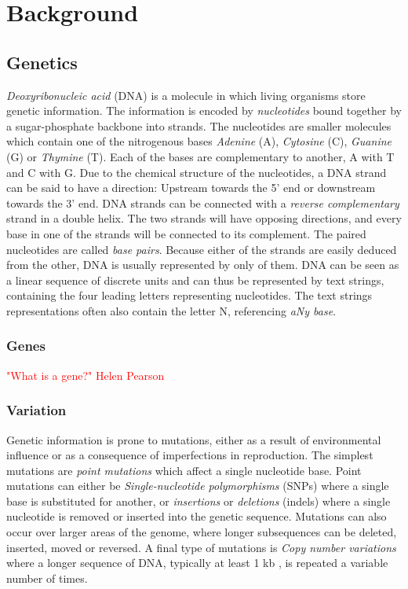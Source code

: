 \documentclass[thesis.tex]{subfiles}
\begin{document}
\chapter{Background}
\section{Genetics}
\textit{Deoxyribonucleic acid} (DNA) is a molecule in which living organisms store genetic information. The information is encoded by \textit{nucleotides} bound together by a sugar-phosphate backbone into strands. The nucleotides are smaller molecules which contain one of the nitrogenous bases \textit{Adenine} (A), \textit{Cytosine} (C), \textit{Guanine} (G) or \textit{Thymine} (T). Each of the bases are complementary to another, A with T and C with G. Due to the chemical structure of the nucleotides, a DNA strand can be said to have a direction: Upstream towards the 5' end or downstream towards the 3' end. DNA strands can be connected with a \textit{reverse complementary} strand in a double helix. The two strands will have opposing directions, and every base in one of the strands will be connected to its complement. The paired nucleotides are called \textit{base pairs}. Because either of the strands are easily deduced from the other, DNA is usually represented by only of them. DNA can be seen as a linear sequence of discrete units and can thus be represented by text strings, containing the four leading letters representing nucleotides. The text strings representations often also contain the letter N, referencing \textit{aNy base}.
\subsection{Genes}
\textcolor{red}{"What is a gene?" Helen Pearson}
\subsection{Variation}
Genetic information is prone to mutations, either as a result of environmental influence or as a consequence of imperfections in reproduction. The simplest mutations are \textit{point mutations} which affect a single nucleotide base. Point mutations can either be \textit{Single-nucleotide polymorphisms} (SNPs) where a single base is substituted for another, or \textit{insertions} or \textit{deletions} (indels) where a single nucleotide is removed or inserted into the genetic sequence. Mutations can also occur over larger areas of the genome, where longer subsequences can be deleted, inserted, moved or reversed. A final type of mutations is \textit{Copy number variations} where a longer sequence of DNA, typically at least 1 kb \cite{copy_number_variation_new_insights_in_genome_diversity}, is repeated a variable number of times.\\
\end{document}
